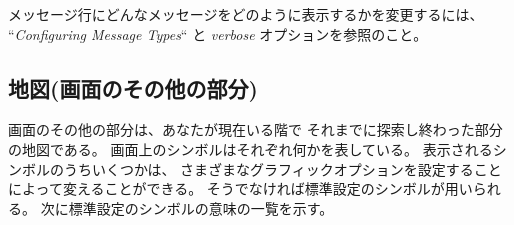 メッセージ行にどんなメッセージをどのように表示するかを変更するには、
``{\it Configuring Message Types\/}`` と
{\it verbose\/} オプションを参照のこと。

\subsection*{地図(画面のその他の部分)}

画面のその他の部分は、あなたが現在いる階で
それまでに探索し終わった部分の地図である。
画面上のシンボルはそれぞれ何かを表している。
表示されるシンボルのうちいくつかは、
さまざまなグラフィックオプションを設定することによって変えることができる。
そうでなければ標準設定のシンボルが用いられる。
次に標準設定のシンボルの意味の一覧を示す。

